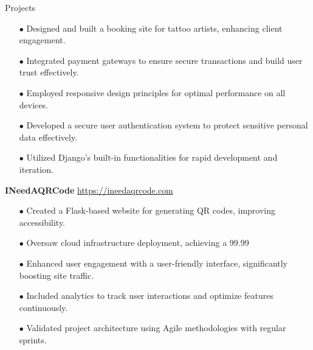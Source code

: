 \begin{rSection}{Projects}
\begin{itemize}[label=\myfancylabel, leftmargin=0.5cm, topsep=-5pt, itemsep=-1ex]
\setlength\itemsep{-0.25cm}
    \item[$\bullet$] Designed and built a booking site for tattoo artists, enhancing client engagement.
    \item[$\bullet$] Integrated payment gateways to ensure secure transactions and build user trust effectively.
    \item[$\bullet$] Employed responsive design principles for optimal performance on all devices.
    \item[$\bullet$] Developed a secure user authentication system to protect sensitive personal data effectively.
    \item[$\bullet$] Utilized Django's built-in functionalities for rapid development and iteration.
\end{itemize}
\vspace{0.12cm}
{\bf INeedAQRCode}
\hspace{2 cm}{Flask, Python}
\hfill{\href{https://ineedaqrcode.com}{https://ineedaqrcode.com}}
\begin{itemize}[label=\myfancylabel, leftmargin=0.5cm, topsep=-5pt, itemsep=-1ex]
\setlength\itemsep{-0.25cm}
    \item[$\bullet$] Created a Flask-based website for generating QR codes, improving accessibility.
    \item[$\bullet$] Oversaw cloud infrastructure deployment, achieving a 99.99%
    \item[$\bullet$] Enhanced user engagement with a user-friendly interface, significantly boosting site traffic.
    \item[$\bullet$] Included analytics to track user interactions and optimize features continuously.
    \item[$\bullet$] Validated project architecture using Agile methodologies with regular sprints.
\end{itemize}
\end{rSection}
